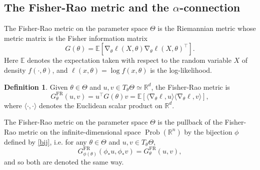 \documentclass[11pt]{amsart}
\theoremstyle{definition}
\newtheorem{definition}[theorem]{Definition}
\DeclareMathOperator{\grad}{\nabla}
\newcommand{\R}{\mathbb R}
\newcommand{\E}{\mathbb E}
\newcommand{\ProbRn}{\operatorname{Prob}(\R^n)}
\newcommand{\GFR}{G^{\mathrm{FR}}}
\begin{document}
\subsection{The Fisher-Rao metric and the $\alpha$-connection}

The Fisher-Rao metric on the parameter space $\Theta$ is the Riemannian metric whose metric matrix is the Fisher information matrix
$$G(\theta)=\E\left[\grad_\theta\ell(X,\theta)\grad_\theta\ell(X,\theta)^\top\right].$$
Here $\E$ denotes the expectation taken with respect to the random variable $X$ of density $f(\cdot,\theta)$, and $\ell(x,\theta)=\log f(x,\theta)$ is the log-likelihood. 
\begin{definition}
    Given $\theta\in\Theta$ and $u,v\in T_\theta\Theta\simeq\R^d$, the Fisher-Rao metric is
    $$\GFR_\theta(u,v)=u^\top G(\theta)v=\E\left[\langle\grad_\theta\ell,u\rangle\langle\grad_\theta\ell,v\rangle\right],$$
    where $\langle\cdot,\cdot\rangle$ denotes the Euclidean scalar product on $\R^d$.
\end{definition}
The Fisher-Rao metric on the parameter space $\Theta$ is the pullback of the Fisher-Rao metric on the infinite-dimensional space $\ProbRn$ by the bijection $\phi$ defined by \eqref{bij}, i.e. for any $\theta\in\Theta$ and $u,v\in T_\theta\Theta$,
$$\GFR_{\phi(\theta)}(\phi_*u,\phi_*v)=\GFR_\theta(u,v),$$
and so both are denoted the same way.
\end{document}
